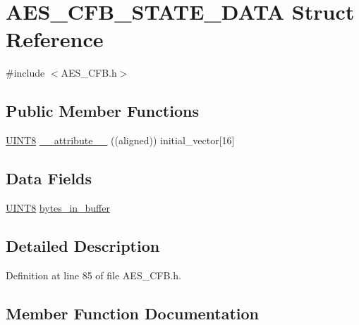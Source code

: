 \hypertarget{struct_a_e_s___c_f_b___s_t_a_t_e___d_a_t_a}{}\section{A\+E\+S\+\_\+\+C\+F\+B\+\_\+\+S\+T\+A\+T\+E\+\_\+\+D\+A\+T\+A Struct Reference}
\label{struct_a_e_s___c_f_b___s_t_a_t_e___d_a_t_a}


{\ttfamily \#include $<$A\+E\+S\+\_\+\+C\+F\+B.\+h$>$}

\subsection*{Public Member Functions}
\begin{DoxyCompactItemize}
\item 
\hyperlink{_generic_type_defs_8h_ab27e9918b538ce9d8ca692479b375b6a}{U\+I\+N\+T8} \hyperlink{struct_a_e_s___c_f_b___s_t_a_t_e___d_a_t_a_a1e8ba219ef73e2cc268297047c8a07fe}{\+\_\+\+\_\+attribute\+\_\+\+\_\+} ((aligned)) initial\+\_\+vector\mbox{[}16\mbox{]}
\end{DoxyCompactItemize}
\subsection*{Data Fields}
\begin{DoxyCompactItemize}
\item 
\hyperlink{_generic_type_defs_8h_ab27e9918b538ce9d8ca692479b375b6a}{U\+I\+N\+T8} \hyperlink{struct_a_e_s___c_f_b___s_t_a_t_e___d_a_t_a_a42834e6ae97a7b670b009a3720484280}{bytes\+\_\+in\+\_\+buffer}
\end{DoxyCompactItemize}


\subsection{Detailed Description}


Definition at line 85 of file A\+E\+S\+\_\+\+C\+F\+B.\+h.



\subsection{Member Function Documentation}
\hypertarget{struct_a_e_s___c_f_b___s_t_a_t_e___d_a_t_a_a1e8ba219ef73e2cc268297047c8a07fe}{}
